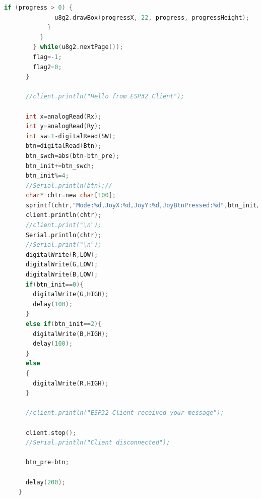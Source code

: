 \documentclass{article}
\begin{document}
\begin{lstlisting}[language=C,caption=ESP32.ino]
            if (progress > 0) {
              u8g2.drawBox(progressX, 22, progress, progressHeight);
            }
          }
        } while(u8g2.nextPage());
        flag=-1;
        flag2=0;
      }
    
      //client.println("Hello from ESP32 Client");
    
      int x=analogRead(Rx);
      int y=analogRead(Ry);
      int sw=1-digitalRead(SW);
      btn=digitalRead(Btn);
      btn_swch=abs(btn-btn_pre);
      btn_init+=btn_swch;
      btn_init%=4;
      //Serial.println(btn);//
      char* chtr=new char[100];
      sprintf(chtr,"Mode:%d,JoyX:%d,JoyY:%d,JoyBtnPressed:%d",btn_init/2,x,y,sw);
      client.println(chtr);
      //client.print("\n");
      Serial.println(chtr);
      //Serial.print("\n");
      digitalWrite(R,LOW);
      digitalWrite(G,LOW);
      digitalWrite(B,LOW);
      if(btn_init==0){
        digitalWrite(G,HIGH);
        delay(100);
      }
      else if(btn_init==2){
        digitalWrite(B,HIGH);
        delay(100);
      }
      else
      {
        digitalWrite(R,HIGH);
      }
    
      //client.println("ESP32 Client received your message");
    
      client.stop();
      //Serial.println("Client disconnected");
    
      btn_pre=btn;
    
      delay(200);
    }
\end{lstlisting}
\end{document}
